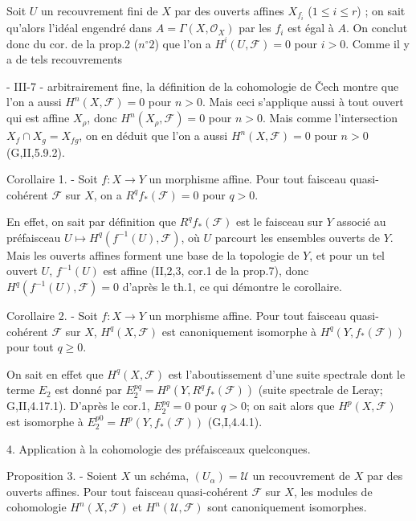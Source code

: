 Soit $U$ un recouvrement fini de $X$ par des ouverts affines $X_{f_i}$ ($1 \le i \le r$) ; on sait qu'alors l'idéal engendré dans $A = \Gamma(X, \mathcal{O}_X)$ par les $f_i$ est égal à $A$. On conclut donc du cor. de la prop.2 ($n^\circ 2$) que l'on a $H^i(U, \mathcal{F}) = 0$ pour $i > 0$. Comme il y a de tels recouvrements

\newpage


- III-7 -
arbitrairement fine, la définition de la cohomologie de Čech montre
que l'on a aussi $H^n(X, \mathcal{F})=0$ pour $n>0$. Mais ceci s'applique aussi à
tout ouvert qui est affine $X_\rho$, donc $H^n(X_\rho, \mathcal{F})=0$ pour $n>0$. Mais comme l'intersection $X_f \cap X_g = X_{fg}$, on en déduit que l'on a aussi $H^n(X, \mathcal{F})=0$ pour $n>0$ (G,II,5.9.2).

Corollaire 1. - Soit $f: X \to Y$ un morphisme affine. Pour tout faisceau quasi-cohérent $\mathcal{F}$ sur $X$, on a $R^q f_*(\mathcal{F})=0$ pour $q>0$.

En effet, on sait par définition que $R^q f_*(\mathcal{F})$ est le faisceau sur $Y$ associé au préfaisceau $U \mapsto H^q(f^{-1}(U), \mathcal{F})$, où $U$ parcourt les ensembles ouverts de $Y$. Mais les ouverts affines forment une base de la topologie de $Y$, et pour un tel ouvert $U$, $f^{-1}(U)$ est affine (II,2,3, cor.1 de la prop.7), donc $H^q(f^{-1}(U), \mathcal{F})=0$ d'après le th.1, ce qui démontre le corollaire.

Corollaire 2. - Soit $f: X \to Y$ un morphisme affine. Pour tout faisceau quasi-cohérent $\mathcal{F}$ sur $X$, $H^q(X, \mathcal{F})$ est canoniquement isomorphe à $H^q(Y, f_*(\mathcal{F}))$ pour tout $q \ge 0$.

On sait en effet que $H^q(X, \mathcal{F})$ est l'aboutissement d'une suite spectrale dont le terme $E_2$ est donné par $E_2^{pq} = H^p(Y, R^q f_*(\mathcal{F}))$ (suite spectrale de Leray; G,II,4.17.1). D'après le cor.1, $E_2^{pq}=0$ pour $q>0$; on sait alors que $H^p(X, \mathcal{F})$ est isomorphe à $E_2^{p0} = H^p(Y, f_*(\mathcal{F}))$ (G,I,4.4.1).

4. Application à la cohomologie des préfaisceaux quelconques.

Proposition 3. - Soient $X$ un schéma, $(U_\alpha) = \mathcal{U}$ un recouvrement de $X$ par des ouverts affines. Pour tout faisceau quasi-cohérent $\mathcal{F}$ sur $X$, les modules de cohomologie $H^n(X, \mathcal{F})$ et $H^n(\mathcal{U}, \mathcal{F})$ sont canoniquement isomorphes.

